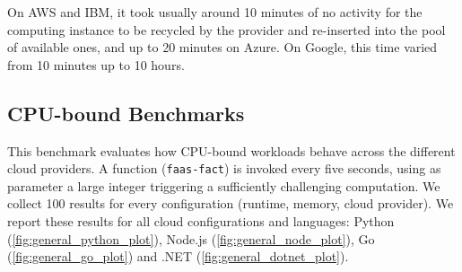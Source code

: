 On \gls{AWS} and \gls{IBM}, it took usually around 10 minutes of no activity for the computing instance to be recycled by the provider and re-inserted into the pool of available ones, and up to 20 minutes on Azure.
On Google, this time varied from 10 minutes up to 10 hours. %

\subsection{CPU-bound Benchmarks}
\label{sec:general_test}

This benchmark evaluates how CPU-bound workloads behave across the different cloud providers.
A function (\texttt{faas-fact}) is invoked every five seconds, using as parameter a large integer triggering a sufficiently challenging computation. 
We collect 100 results for every configuration (runtime, memory, cloud provider).
We report these results for all cloud configurations and languages: Python (\autoref{fig:general_python_plot}), Node.js (\autoref{fig:general_node_plot}), Go (\autoref{fig:general_go_plot}) and .NET (\autoref{fig:general_dotnet_plot}).

